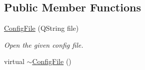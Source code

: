 \subsection*{Public Member Functions}
\begin{DoxyCompactItemize}
\item 
\hyperlink{class_a_w_e_1_1_config_file_aae513c1b94bc74ad30894a11b1d6b547}{Config\-File} (Q\-String file)
\begin{DoxyCompactList}\small\item\em Open the given config file. \end{DoxyCompactList}\item 
\hypertarget{class_a_w_e_1_1_config_file_aa6a9cb6df5f768702ba640d71918d778}{virtual \hyperlink{class_a_w_e_1_1_config_file_aa6a9cb6df5f768702ba640d71918d778}{$\sim$\-Config\-File} ()}\label{class_a_w_e_1_1_config_file_aa6a9cb6df5f768702ba640d71918d778}


\end{DoxyCompactItemize}
